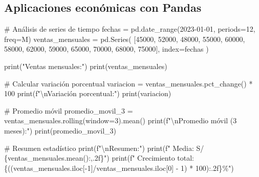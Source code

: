\documentclass[
  doc,
  floatsintext,
  longtable,
  a4paper,
  nolmodern,
  notxfonts,
  notimes,
  12pt,
  colorlinks=true,linkcolor=blue,citecolor=blue,urlcolor=blue]{apa7}
\newenvironment{Shaded}{\begin{snugshade}}{\end{snugshade}}
\newcommand{\BuiltInTok}[1]{\textcolor[rgb]{0.00,0.23,0.31}{#1}}
\newcommand{\CharTok}[1]{\textcolor[rgb]{0.13,0.47,0.30}{#1}}
\newcommand{\CommentTok}[1]{\textcolor[rgb]{0.37,0.37,0.37}{#1}}
\newcommand{\DecValTok}[1]{\textcolor[rgb]{0.68,0.00,0.00}{#1}}
\newcommand{\NormalTok}[1]{\textcolor[rgb]{0.00,0.23,0.31}{#1}}
\newcommand{\OperatorTok}[1]{\textcolor[rgb]{0.37,0.37,0.37}{#1}}
\newcommand{\SpecialCharTok}[1]{\textcolor[rgb]{0.37,0.37,0.37}{#1}}
\newcommand{\SpecialStringTok}[1]{\textcolor[rgb]{0.13,0.47,0.30}{#1}}
\newcommand{\StringTok}[1]{\textcolor[rgb]{0.13,0.47,0.30}{#1}}
\begin{document}
\subsection{Aplicaciones económicas con
Pandas}\label{aplicaciones-econuxf3micas-con-pandas}

\begin{Shaded}
\begin{Highlighting}[]
\CommentTok{\# Análisis de series de tiempo}
\NormalTok{fechas }\OperatorTok{=}\NormalTok{ pd.date\_range(}\StringTok{\textquotesingle{}2023{-}01{-}01\textquotesingle{}}\NormalTok{, periods}\OperatorTok{=}\DecValTok{12}\NormalTok{, freq}\OperatorTok{=}\StringTok{\textquotesingle{}M\textquotesingle{}}\NormalTok{)}
\NormalTok{ventas\_mensuales }\OperatorTok{=}\NormalTok{ pd.Series(}
\NormalTok{    [}\DecValTok{45000}\NormalTok{, }\DecValTok{52000}\NormalTok{, }\DecValTok{48000}\NormalTok{, }\DecValTok{55000}\NormalTok{, }\DecValTok{60000}\NormalTok{, }\DecValTok{58000}\NormalTok{, }
     \DecValTok{62000}\NormalTok{, }\DecValTok{59000}\NormalTok{, }\DecValTok{65000}\NormalTok{, }\DecValTok{70000}\NormalTok{, }\DecValTok{68000}\NormalTok{, }\DecValTok{75000}\NormalTok{],}
\NormalTok{    index}\OperatorTok{=}\NormalTok{fechas}
\NormalTok{)}

\BuiltInTok{print}\NormalTok{(}\StringTok{"Ventas mensuales:"}\NormalTok{)}
\BuiltInTok{print}\NormalTok{(ventas\_mensuales)}

\CommentTok{\# Calcular variación porcentual}
\NormalTok{variacion }\OperatorTok{=}\NormalTok{ ventas\_mensuales.pct\_change() }\OperatorTok{*} \DecValTok{100}
\BuiltInTok{print}\NormalTok{(}\SpecialStringTok{f"}\CharTok{\textbackslash{}n}\SpecialStringTok{Variación porcentual:"}\NormalTok{)}
\BuiltInTok{print}\NormalTok{(variacion)}

\CommentTok{\# Promedio móvil}
\NormalTok{promedio\_movil\_3 }\OperatorTok{=}\NormalTok{ ventas\_mensuales.rolling(window}\OperatorTok{=}\DecValTok{3}\NormalTok{).mean()}
\BuiltInTok{print}\NormalTok{(}\SpecialStringTok{f"}\CharTok{\textbackslash{}n}\SpecialStringTok{Promedio móvil (3 meses):"}\NormalTok{)}
\BuiltInTok{print}\NormalTok{(promedio\_movil\_3)}

\CommentTok{\# Resumen estadístico}
\BuiltInTok{print}\NormalTok{(}\SpecialStringTok{f"}\CharTok{\textbackslash{}n}\SpecialStringTok{Resumen:"}\NormalTok{)}
\BuiltInTok{print}\NormalTok{(}\SpecialStringTok{f"  Media: S/ }\SpecialCharTok{\{}\NormalTok{ventas\_mensuales}\SpecialCharTok{.}\NormalTok{mean()}\SpecialCharTok{:,.2f\}}\SpecialStringTok{"}\NormalTok{)}
\BuiltInTok{print}\NormalTok{(}\SpecialStringTok{f"  Crecimiento total: }\SpecialCharTok{\{}\NormalTok{((ventas\_mensuales.iloc[}\OperatorTok{{-}}\DecValTok{1}\NormalTok{]}\OperatorTok{/}\NormalTok{ventas\_mensuales.iloc[}\DecValTok{0}\NormalTok{] }\OperatorTok{{-}} \DecValTok{1}\NormalTok{) }\OperatorTok{*} \DecValTok{100}\NormalTok{)}\SpecialCharTok{:.2f\}}\SpecialStringTok{\%"}\NormalTok{)}
\end{Highlighting}
\end{Shaded}
\end{document}
